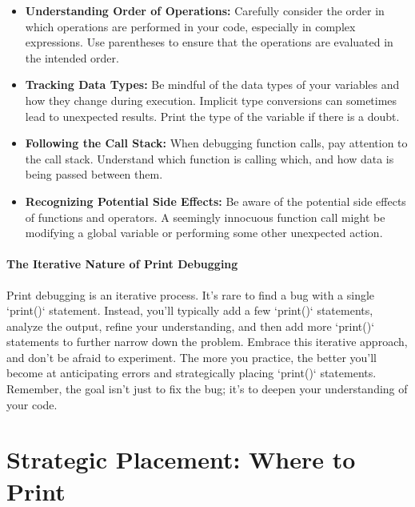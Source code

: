 \documentclass{article}
\begin{document}
\begin{itemize}
    \item \textbf{Understanding Order of Operations:} Carefully consider the order in which operations are performed in your code, especially in complex expressions. Use parentheses to ensure that the operations are evaluated in the intended order.

    \item \textbf{Tracking Data Types:} Be mindful of the data types of your variables and how they change during execution. Implicit type conversions can sometimes lead to unexpected results. Print the type of the variable if there is a doubt.

    \item \textbf{Following the Call Stack:} When debugging function calls, pay attention to the call stack. Understand which function is calling which, and how data is being passed between them.

    \item \textbf{Recognizing Potential Side Effects:} Be aware of the potential side effects of functions and operators. A seemingly innocuous function call might be modifying a global variable or performing some other unexpected action.
\end{itemize}

\subsection*{The Iterative Nature of Print Debugging}

Print debugging is an iterative process. It's rare to find a bug with a single `print()` statement. Instead, you'll typically add a few `print()` statements, analyze the output, refine your understanding, and then add more `print()` statements to further narrow down the problem. Embrace this iterative approach, and don't be afraid to experiment. The more you practice, the better you'll become at anticipating errors and strategically placing `print()` statements. Remember, the goal isn't just to fix the bug; it's to deepen your understanding of your code.


\part*{Strategic Placement: Where to Print} %
\label{part-3-Strategic_Placement__Where_to_Print}
\end{document}
